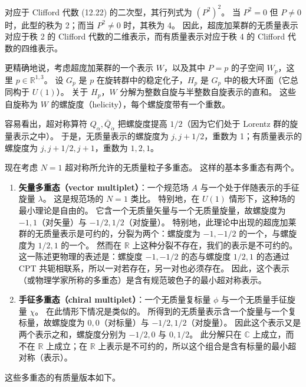 对应于 Clifford 代数 (12.22) 的二次型，其行列式为 $(P^2)^2$。
当 $P^2=0$ 但 $P\ne0$ 时，此型的秩为 2；而当 $P^2\ne0$ 时，其秩为 4。
因此，超庞加莱群的无质量表示对应于秩 2 的 Clifford 代数的二维表示，而有质量表示对应于秩 4 的 Clifford 代数的四维表示。

更精确地说，考虑超庞加莱群的一个表示 $W$，以及其中 $P=p$ 的子空间 $W_p$，这里 $p\in\mathbb{R}^{1,3}$。
设 $G_p$ 是 $p$ 在旋转群中的稳定化子，$H_p$ 是 $G_p$ 中的极大环面（它总同构于 $U(1)$）。
关于 $H_p$，$W$ 分解为整数自旋与半整数自旋表示的直和。
这些自旋称为 $W$ 的螺旋度（helicity），每个螺旋度带有一个重数。

容易看出，超对称算符 $Q_\alpha,\bar Q_{\dot\alpha}$ 把螺旋度提高 $1/2$（因为它们处于 Lorentz 群的旋量表示之中）。
于是，无质量表示的螺旋度为 $j,j+1/2$，重数为 1；有质量表示的螺旋度为 $j,j+1/2,j+1$，重数为 $1,2,1$。

现在考虑 $N=1$ 超对称所允许的无质量粒子多重态。
这样的基本多重态有两个。

\begin{enumerate}
\item \textbf{矢量多重态（vector multiplet）}：一个规范场 $A$ 与一个处于伴随表示的手征旋量 $\lambda$。
  这是规范场的 $N=1$ 类比。
  特别地，在 $U(1)$ 情形下，这种场的最小理论是自由的。
  它含一个无质量矢量与一个无质量旋量，故螺旋度为 $-1,1$（对矢量）与 $-1/2,1/2$（对旋量）。
  特别地，此理论中出现的超庞加莱群的无质量表示是可约的，分裂为两个：螺旋度为 $-1,-1/2$ 的一个，与螺旋度为 $1/2,1$ 的一个。
  然而在 $\mathbb{R}$ 上这种分裂不存在，我们的表示是不可约的。
  这一陈述更物理的表述是：螺旋度 $-1,-1/2$ 的态与螺旋度 $1/2,1$ 的态通过 CPT 共轭相联系，所以一对若存在，另一对也必须存在。
  因此，这个表示（或物理学家所称的多重态）是含有规范玻色子的最小超对称表示。
\end{enumerate}

\begin{enumerate}
\setcounter{enumi}{1}
\item \textbf{手征多重态（chiral multiplet）}：一个无质量复标量 $\phi$ 与一个无质量手征旋量 $\chi$。
  在此情形下情况是类似的。
  所得到的无质量表示含一个旋量与一个复标量，故螺旋度为 $0,0$（对标量）与 $-1/2,1/2$（对旋量）。
  因此这个表示又是两个表示之和，螺旋度分别为 $-1/2,0$ 与 $0,1/2$。
  此分解只在 $\mathbb{C}$ 上成立，而不在 $\mathbb{R}$ 上成立；在 $\mathbb{R}$ 上表示是不可约的，所以这个组合是含有标量的最小超对称（表示）。
\end{enumerate}

这些多重态的有质量版本如下。

